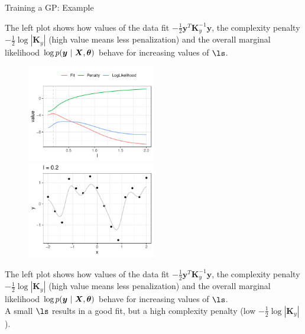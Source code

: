 \documentclass[11pt,compress,t,notes=noshow, xcolor=table]{beamer}
\begin{document}
\begin{vbframe}{Training a GP: Example}
\begin{footnotesize}
	The left plot shows how values of the data fit $-\frac{1}{2}\bm{y}^T\bm{K}_y^{-1} \bm{y}$, the complexity penalty $- \frac{1}{2} \log \left| \bm{K}_y \right|$ (high value means less penalization) and the overall marginal likelihood $\log p(\bm{y} ~|~ \bm{X}, \bm{\theta})$ behave for increasing values of $\ls$.
\end{footnotesize}


\framebreak 

\begin{figure}
	\includegraphics[width = 0.5\textwidth]{figure/gp_training/fit_vs_penalty_0_2.pdf}~	\includegraphics[width = 0.5\textwidth]{figure/gp_training/datapoints_0_2.pdf}
\end{figure}

\begin{footnotesize}
		The left plot shows how values of the data fit $-\frac{1}{2}\bm{y}^T\bm{K}_y^{-1} \bm{y}$, the complexity penalty $- \frac{1}{2} \log \left| \bm{K}_y \right|$ (high value means less penalization) and the overall marginal likelihood $\log p(\bm{y} ~|~ \bm{X}, \bm{\theta})$ behave for increasing values of $\ls$.\\ 
		A small $\ls$ results in a good fit, but a high complexity penalty (low $- \frac{1}{2} \log \left| \bm{K}_y \right|$).
\end{footnotesize}

\framebreak


\end{vbframe}
\end{document}
